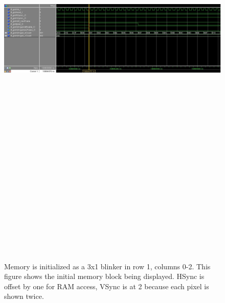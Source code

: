 \documentclass[twoside, letterpaper]{report}
\begin{document}
\begin{figure}
\centering
\includegraphics[angle=90, height=9in]{./media/blinker_1.jpg}
\caption{\label{fig:blinker1}Memory is initialized as a 3x1 blinker in row 1, columns 0-2. This figure shows the initial memory block being displayed. HSync is offset by one for RAM access, VSync is at 2 because each pixel is shown twice.}
\end{figure}
\end{document}

